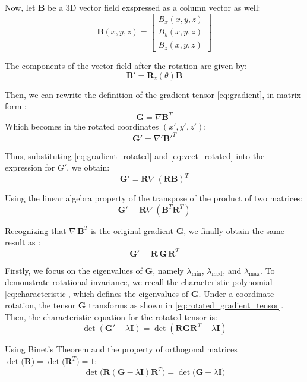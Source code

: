\noindent
Now, let \( \mathbf{B} \) be a 3D vector field exspressed as a column vector as well:
\[
\mathbf{B}(x, y, z) = 
\begin{bmatrix}
    B_x(x, y, z) \\
    B_y(x, y, z) \\
    B_z(x, y, z)
\end{bmatrix}
\]

\noindent
The components of the vector field after the rotation 
are given by:
\begin{equation}
    \mathbf{B}' = \mathbf{R}_z(\theta) \mathbf{B}
\label{eq:vect_rotated}
\end{equation}

\noindent
Then, we can rewrite the definition of the gradient tensor \ref{eq:gradient},
in matrix form \cite{gradient_tensor_rotated}:
\[
\mathbf{G} = \nabla \mathbf{B}^T
\]
Which becomes in the rotated coordinates $(x', y', z')$:
\[
\mathbf{G}' = \nabla' \mathbf{B}'^T
\]

\noindent
Thus, substituting \ref{eq:gradient_rotated} and \ref{eq:vect_rotated}
into the expression for \( G' \), we obtain:
\[
\mathbf{G}' = \mathbf{R} \nabla \, (\mathbf{R} \mathbf{B})^T
\]

\noindent
Using the linear algebra property of the transpose of the product of two matrices:
\[
\mathbf{G}' = \mathbf{R} \nabla \, (\mathbf{B}^T \mathbf{R}^T)
\]

\noindent
Recognizing that \( \nabla \, \mathbf{B}^T \) is the original gradient 
\( \mathbf{G} \), we finally obtain the same result as \cite{gradient_tensor_rotated}:
\begin{equation}
    \mathbf{G}' = \mathbf{R} \, \mathbf{G} \, \mathbf{R}^T
    \label{eq:rotated_gradient_tensor}
\end{equation}

\noindent
Firstly, we focus on the eigenvalues of \( \mathbf{G} \), namely 
\( \lambda_{\text{min}} \), \( \lambda_{\text{med}} \), and \( \lambda_{\text{max}} \). 
To demonstrate rotational invariance, we recall the characteristic polynomial 
\ref{eq:characteristic}, which defines the eigenvalues of \( \mathbf{G} \). 
Under a coordinate rotation, the tensor \( \mathbf{G} \) transforms as shown in 
\eqref{eq:rotated_gradient_tensor}. Then, the characteristic equation for the rotated tensor is:
\[
    \det(\mathbf{G}' - \lambda \mathbf{I}) = 
    \det(\mathbf{R} \mathbf{G} \mathbf{R}^T - \lambda \mathbf{I})
\]

\noindent
Using Binet's Theorem and the property of orthogonal matrices \( \det\big(\mathbf{R}\big) = \det\big(\mathbf{R}^T\big) = 1 \):
\[
    \det\big(\mathbf{R} (\mathbf{G} - \lambda \mathbf{I}) \mathbf{R}^T\big) = 
    \det\big(\mathbf{G} - \lambda \mathbf{I}\big)
\]

